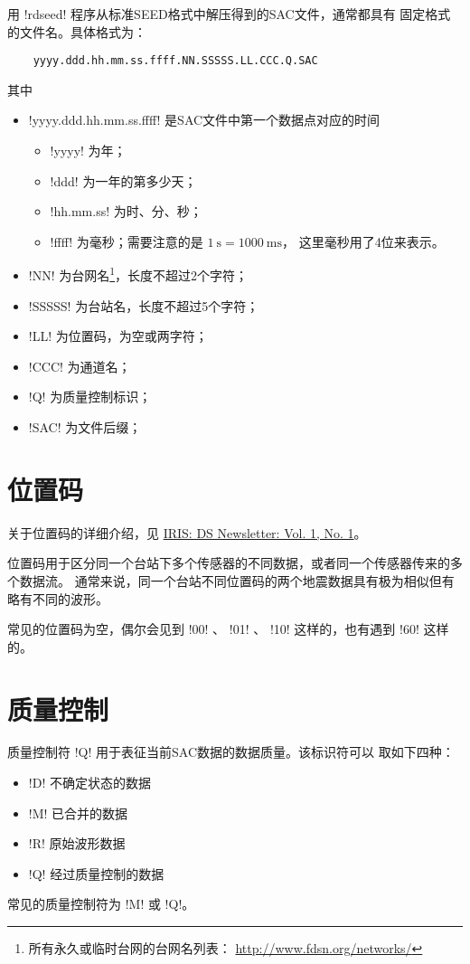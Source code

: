 用 !rdseed! 程序从标准SEED格式中解压得到的SAC文件，通常都具有
固定格式的文件名。具体格式为：
\begin{verbatim}
    yyyy.ddd.hh.mm.ss.ffff.NN.SSSSS.LL.CCC.Q.SAC
\end{verbatim}
其中
\begin{itemize}
\item !yyyy.ddd.hh.mm.ss.ffff! 是SAC文件中第一个数据点对应的时间
    \begin{itemize}
    \item !yyyy! 为年；
    \item !ddd! 为一年的第多少天；
    \item !hh.mm.ss! 为时、分、秒；
    \item !ffff! 为毫秒；需要注意的是 $\SI{1}{\s}=\SI{1000}{\ms}$，
        这里毫秒用了4位来表示。
    \end{itemize}
\item !NN! 为台网名\footnote{所有永久或临时台网的台网名列表：
    \url{http://www.fdsn.org/networks/}}，长度不超过2个字符；
\item !SSSSS! 为台站名，长度不超过5个字符；
\item !LL! 为位置码，为空或两字符；
\item !CCC! 为通道名；
\item !Q! 为质量控制标识；
\item !SAC! 为文件后缀；
\end{itemize}

\section{位置码}

关于位置码的详细介绍，见 \href{http://ds.iris.edu/ds/newsletter/vol1/no1/specification-of-seismograms-the-location-identifier/}{IRIS: DS Newsletter: Vol. 1, No. 1}。

位置码用于区分同一个台站下多个传感器的不同数据，或者同一个传感器传来的多个数据流。
通常来说，同一个台站不同位置码的两个地震数据具有极为相似但有略有不同的波形。

常见的位置码为空，偶尔会见到 !00! 、 !01! 、 !10! 这样的，也有遇到 !60! 这样的。

\section{质量控制}
\label{sec:quality-control}
质量控制符 !Q! 用于表征当前SAC数据的数据质量。该标识符可以
取如下四种：
\begin{itemize}
\item !D! 不确定状态的数据
\item !M! 已合并的数据
\item !R! 原始波形数据
\item !Q! 经过质量控制的数据
\end{itemize}
常见的质量控制符为 !M! 或 !Q!。

